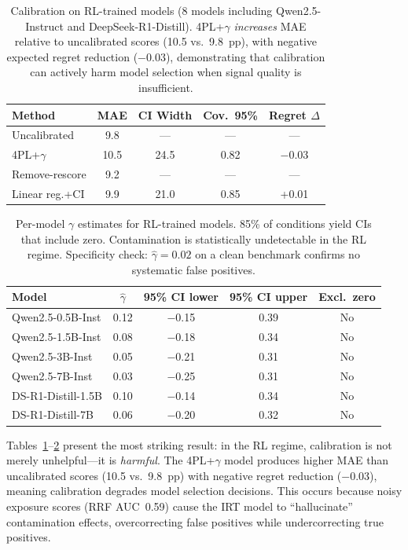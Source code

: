 \documentclass[letterpaper, 10pt, twocolumn]{article}
\begin{document}
\begin{table}[t]
\centering
\caption{Calibration on RL-trained models (8 models including Qwen2.5-Instruct and DeepSeek-R1-Distill). 4PL+$\gamma$ \emph{increases} MAE relative to uncalibrated scores (10.5 vs.\ 9.8~pp), with negative expected regret reduction ($-$0.03), demonstrating that calibration can actively harm model selection when signal quality is insufficient.}
\label{tab:rl_case_study}
\small
\begin{tabular}{lcccc}
\toprule
Method & MAE & CI Width & Cov.\ 95\% & Regret $\Delta$ \\
\midrule
Uncalibrated & 9.8 & --- & --- & --- \\
4PL+$\gamma$ & 10.5 & 24.5 & 0.82 & $-$0.03 \\
Remove-rescore & 9.2 & --- & --- & --- \\
Linear reg.+CI & 9.9 & 21.0 & 0.85 & +0.01 \\
\bottomrule
\end{tabular}
\end{table}

\begin{table}[t]
\centering
\caption{Per-model $\gamma$ estimates for RL-trained models. 85\% of conditions yield CIs that include zero. Contamination is statistically undetectable in the RL regime. Specificity check: $\hat{\gamma} = 0.02$ on a clean benchmark confirms no systematic false positives.}
\label{tab:rl_gamma}
\small
\begin{tabular}{lcccc}
\toprule
Model & $\hat{\gamma}$ & 95\% CI lower & 95\% CI upper & Excl.\ zero \\
\midrule
Qwen2.5-0.5B-Inst & 0.12 & $-$0.15 & 0.39 & No \\
Qwen2.5-1.5B-Inst & 0.08 & $-$0.18 & 0.34 & No \\
Qwen2.5-3B-Inst & 0.05 & $-$0.21 & 0.31 & No \\
Qwen2.5-7B-Inst & 0.03 & $-$0.25 & 0.31 & No \\
DS-R1-Distill-1.5B & 0.10 & $-$0.14 & 0.34 & No \\
DS-R1-Distill-7B & 0.06 & $-$0.20 & 0.32 & No \\
\bottomrule
\end{tabular}
\end{table}

Tables~\ref{tab:rl_case_study}--\ref{tab:rl_gamma} present the most striking result: in the RL regime, calibration is not merely unhelpful---it is \emph{harmful}.
The 4PL+$\gamma$ model produces higher MAE than uncalibrated scores (10.5 vs.\ 9.8~pp) with negative regret reduction ($-$0.03), meaning calibration degrades model selection decisions.
This occurs because noisy exposure scores (RRF AUC~0.59) cause the IRT model to ``hallucinate'' contamination effects, overcorrecting false positives while undercorrecting true positives.
\end{document}
